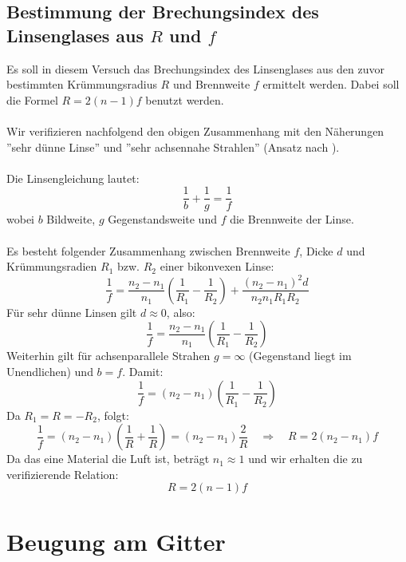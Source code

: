 \documentclass[a4paper,titlepage]{scrartcl}
\numberwithin{equation}{section}
\begin{document}
\subsection{Bestimmung der Brechungsindex des Linsenglases aus $R$ und $f$}
Es soll in diesem Versuch das Brechungsindex des Linsenglases aus den zuvor bestimmten Krümmungsradius $R$ und Brennweite $f$ ermittelt werden. Dabei soll die Formel $R=2(n-1)f$ benutzt werden.\\ \\
Wir verifizieren nachfolgend den obigen Zusammenhang mit den Näherungen ''sehr dünne Linse'' und ''sehr achsennahe Strahlen'' (Ansatz nach \cite{wiki:naeherungduennelinse}).\\ \\
Die Linsengleichung lautet:
\begin{equation}
\label{gl:9}
\frac{1}{b}+\frac{1}{g}=\frac{1}{f}
\end{equation}
wobei $b$ Bildweite, $g$ Gegenstandsweite und $f$ die Brennweite der Linse.\\ \\
Es besteht folgender Zusammenhang zwischen Brennweite $f$, Dicke $d$ und Krümmungsradien $R_1$ bzw. $R_2$ einer bikonvexen Linse:
\begin{equation*}
\frac{1}{f}=\frac{n_2-n_1}{n_1} \left( \frac{1}{R_1}-\frac{1}{R_2} \right) + \frac{(n_2-n_1)^2 d}{n_2 n_1 R_1 R_2}
\end{equation*}
Für sehr dünne Linsen gilt $d \approx 0$, also:
\begin{equation}
\label{gl:8}
\frac{1}{f}=\frac{n_2-n_1}{n_1} \left(\frac{1}{R_1}-\frac{1}{R_2} \right)
\end{equation}
Weiterhin gilt für achsenparallele Strahen $g=\infty$ (Gegenstand liegt im Unendlichen) und $b=f$. Damit:
\begin{equation*}
\frac{1}{f}=(n_2-n_1) \left(\frac{1}{R_1}-\frac{1}{R_2} \right)
\end{equation*}
Da $R_1=R=-R_2$, folgt:
\begin{equation}
\frac{1}{f}=(n_2-n_1) \left(\frac{1}{R}+\frac{1}{R} \right)=(n_2-n_1) \frac{2}{R} \quad \Rightarrow \quad R=2(n_2-n_1)f
\end{equation}
Da das eine Material die Luft ist, beträgt $n_1 \approx 1$ und wir erhalten die zu verifizierende Relation:
\begin{equation*}
R=2(n-1)f
\end{equation*}

\section{Beugung am Gitter}
\end{document}
